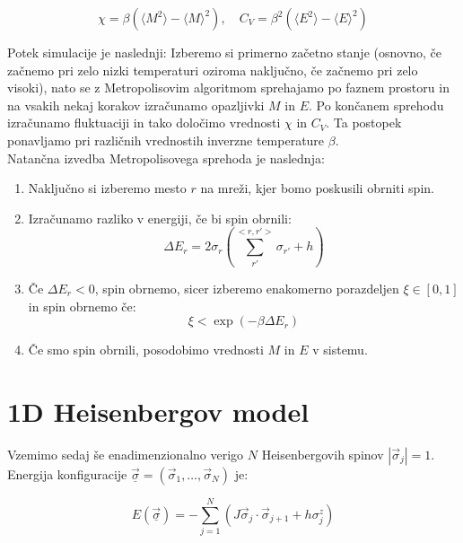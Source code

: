 \documentclass[a4paper]{article}
\newcommand{\s}{\sigma}
\newcommand{\vs}{\vec{\s}}
\newcommand{\uvs}{\underline{\vs}}
\newcommand{\expected}[1]{\langle #1 \rangle}
\newcommand{\D}{\Delta}
\begin{document}
    \begin{equation}\label{eq5}
        \chi = \beta (\expected{M^2} - \expected{M}^2), \quad C_V = \beta^2(\expected{E^2} - \expected{E}^2)
    \end{equation}

    Potek simulacije je naslednji: Izberemo si primerno začetno stanje (osnovno, če začnemo pri
    zelo nizki temperaturi oziroma naključno, če začnemo pri zelo visoki), nato se z Metropolisovim algoritmom
    sprehajamo po faznem prostoru in na vsakih nekaj korakov izračunamo opazljivki $M$ in $E$.
    Po končanem sprehodu izračunamo fluktuaciji in tako določimo vrednosti $\chi$ in $C_V$.
    Ta postopek ponavljamo pri različnih vrednostih inverzne temperature $\beta$. \\

    Natančna izvedba Metropolisovega sprehoda je naslednja:

    \begin{enumerate}
        \item Naključno si izberemo mesto $r$ na mreži, kjer bomo poskusili obrniti spin.

        \item Izračunamo razliko v energiji, če bi spin obrnili:
        \begin{equation}\label{eq6}
        \D E_r = 2\s_r \left( \sum_{r'}^{<r, r'>} \s_{r'} + h \right)
        \end{equation}

        \item Če $\D E_r < 0$, spin obrnemo, sicer izberemo enakomerno porazdeljen $\xi \in [0, 1]$ in spin obrnemo če:
        \begin{equation}\label{eq7}
            \xi < \exp(-\beta \D E_r)
        \end{equation}

        \item Če smo spin obrnili, posodobimo vrednosti $M$ in $E$ v sistemu.

    \end{enumerate}

    \section{1D Heisenbergov model}

    Vzemimo sedaj še enadimenzionalno verigo $N$ Heisenbergovih spinov $|\vs_j| = 1$.
    Energija konfiguracije $\uvs = (\vs_1, \ldots, \vs_N)$ je:

    \begin{equation}\label{eq8}
        E(\uvs) = -\sum_{j=1}^N (J \vs_j \cdot \vs_{j+1} + h\s_j^z)
    \end{equation}
\end{document}
